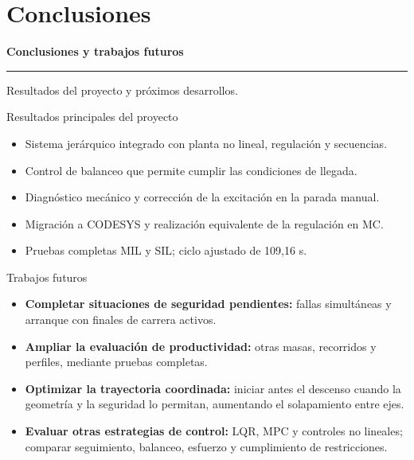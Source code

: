 \documentclass[aspectratio=169,11pt]{beamer}
\begin{document}
\section{Conclusiones}
\begin{frame}[plain,label=seccion10]
\vfill
{\fontsize{25}{29}\selectfont\bfseries Conclusiones y trabajos futuros\par}
\vspace{4mm}\textcolor{accent}{\rule{.75\linewidth}{1pt}}\par\vspace{3mm}
{\large Resultados del proyecto y próximos desarrollos.\par}\vfill
{}
\end{frame}
\begin{frame}[t,label=slide89]{Resultados principales del proyecto}
\begin{itemize}
\item Sistema jerárquico integrado con planta no lineal, regulación y secuencias.
\item Control de balanceo que permite cumplir las condiciones de llegada.
\item Diagnóstico mecánico y corrección de la excitación en la parada manual.
\item Migración a CODESYS y realización equivalente de la regulación en MC.
\item Pruebas completas MIL y SIL; ciclo ajustado de 109,16 s.
\end{itemize}
\end{frame}

\begin{frame}[t,label=trabajosfuturos]{Trabajos futuros}
\relax
\begin{itemize}
\item \textbf{Completar situaciones de seguridad pendientes:} fallas simultáneas y arranque con finales de carrera activos.
\item \textbf{Ampliar la evaluación de productividad:} otras masas, recorridos y perfiles, mediante pruebas completas.
\item \textbf{Optimizar la trayectoria coordinada:} iniciar antes el descenso cuando la geometría y la seguridad lo permitan, aumentando el solapamiento entre ejes.
\item \textbf{Evaluar otras estrategias de control:} LQR, MPC y controles no lineales; comparar seguimiento, balanceo, esfuerzo y cumplimiento de restricciones.
\end{itemize}
\end{frame}
\end{document}
